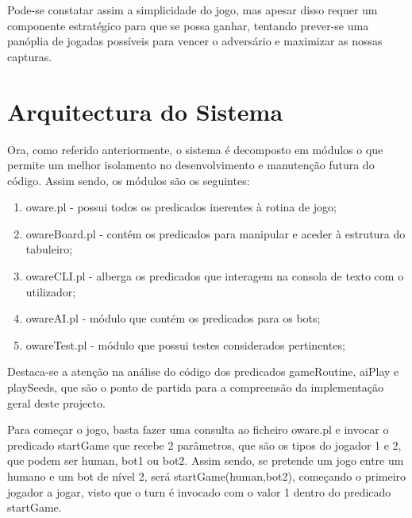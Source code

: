 \documentclass[15pt,a4paper]{article}
\begin{document}
Pode-se constatar assim a simplicidade do jogo, mas apesar disso requer um componente estratégico para que se possa ganhar, tentando prever-se uma panóplia de jogadas possíveis para vencer o adversário e maximizar as nossas capturas.

\section{Arquitectura do Sistema}
Ora, como referido anteriormente, o sistema é decomposto em módulos o que permite um melhor isolamento no desenvolvimento e manutenção futura do código. Assim sendo, os módulos são os seguintes:
\begin{enumerate}
  \item oware.pl - possui todos os predicados inerentes à rotina de jogo;
  \item owareBoard.pl - contém os predicados para manipular e aceder à estrutura do tabuleiro;
  \item owareCLI.pl - alberga os predicados que interagem na consola de texto com o utilizador;
  \item owareAI.pl - módulo que contém os predicados para os bots;
  \item owareTest.pl - módulo que possui testes considerados pertinentes;
\end{enumerate}

\indent Destaca-se a atenção na análise do código dos predicados gameRoutine, aiPlay e playSeeds, que são o ponto de partida para a compreensão da implementação geral deste projecto.

\indent Para começar o jogo, basta fazer uma consulta ao ficheiro oware.pl e invocar o predicado startGame que recebe 2 parâmetros, que são os tipos do jogador 1 e 2, que podem ser human, bot1 ou bot2. Assim sendo, se pretende um jogo entre um humano e um bot de nível 2, será startGame(human,bot2), começando o primeiro jogador a jogar, visto que o turn é invocado com o valor 1 dentro do predicado startGame. 


\newpage
\end{document}
